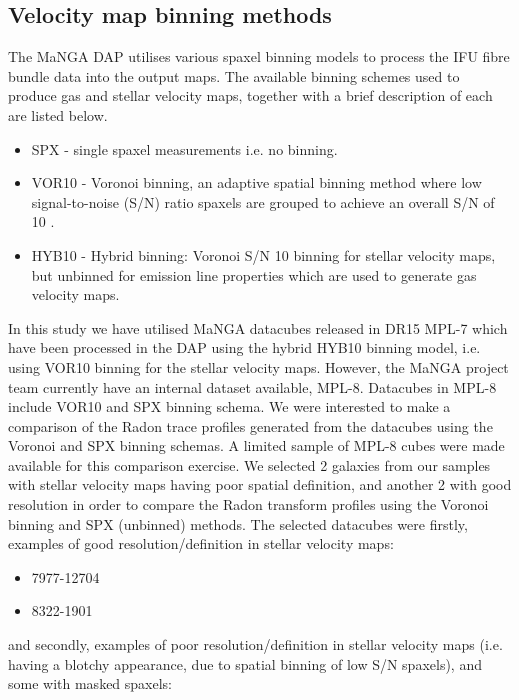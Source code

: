 \subsection{Velocity map binning methods}
\label{sec:binning-methods}
The MaNGA DAP utilises various spaxel binning models to process the IFU fibre bundle data into the output maps. The available binning schemes used to produce gas and stellar velocity maps, together with a brief description of each are listed below.

\begin{itemize}
    \item SPX - single spaxel measurements i.e. no binning.
    \item VOR10 - Voronoi binning, an adaptive spatial binning method where low signal-to-noise (S/N) ratio spaxels are grouped to achieve an overall S/N of 10  \citep{2003MNRAS.342..345C, 2019arXiv190100856W}.
    \item HYB10 - Hybrid binning: Voronoi S/N 10 binning for stellar velocity maps, but unbinned for emission line properties which are used to generate gas velocity maps.
\end{itemize}  

In this study we have utilised MaNGA datacubes released in DR15 MPL-7 which have been processed in the DAP using the hybrid HYB10 binning model, i.e. using VOR10 binning for the stellar velocity maps. However, the MaNGA project team currently have an internal dataset available, MPL-8. Datacubes in MPL-8 include VOR10 and SPX binning schema. We were interested to make a comparison of the Radon trace profiles generated from the datacubes using the Voronoi and SPX binning schemas. A limited sample of MPL-8 cubes were made available for this comparison exercise. We selected 2 galaxies from our samples with stellar velocity maps having poor spatial definition, and another 2 with good resolution in order to compare the Radon transform profiles using the Voronoi binning and SPX (unbinned) methods. The selected datacubes were firstly, examples of good resolution/definition in stellar velocity maps:

\begin{itemize}
    \item 7977-12704
    \item 8322-1901
\end{itemize}

and secondly, examples of poor resolution/definition in stellar velocity maps (i.e. having a blotchy appearance, due to spatial binning of low S/N spaxels), and some with masked spaxels:

